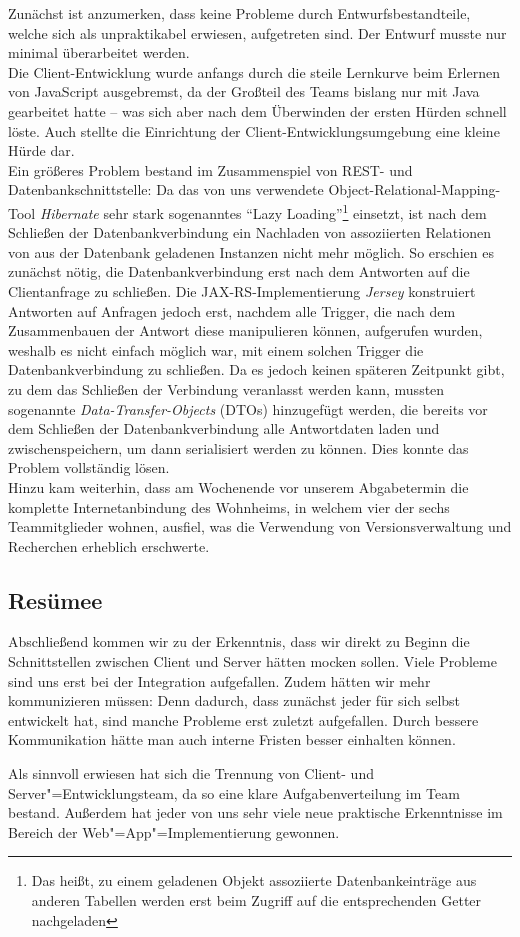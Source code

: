  Zunächst ist anzumerken, dass keine Probleme durch Entwurfsbestandteile, welche sich als unpraktikabel erwiesen, aufgetreten sind. Der Entwurf musste nur minimal überarbeitet werden. \\
 Die Client-Entwicklung wurde anfangs durch die steile Lernkurve beim Erlernen von JavaScript ausgebremst, da der Großteil des Teams bislang nur mit Java gearbeitet hatte -- was sich aber nach dem Überwinden der ersten Hürden schnell löste. Auch stellte die Einrichtung der Client-Entwicklungsumgebung eine kleine Hürde dar.\\
 Ein größeres Problem bestand im Zusammenspiel von REST- und Datenbankschnittstelle: Da das von uns verwendete Object-Relational-Mapping-Tool \textit{Hibernate} sehr stark sogenanntes \enquote{Lazy Loading}\footnote{Das heißt, zu einem geladenen Objekt assoziierte Datenbankeinträge aus anderen Tabellen werden erst beim Zugriff auf die entsprechenden Getter nachgeladen} einsetzt, ist nach dem Schließen der Datenbankverbindung ein Nachladen von assoziierten Relationen von aus der Datenbank geladenen Instanzen nicht mehr möglich. So erschien es zunächst nötig, die Datenbankverbindung erst nach dem Antworten auf die Clientanfrage zu schließen. Die JAX-RS-Implementierung \textit{Jersey} konstruiert Antworten auf Anfragen jedoch erst, nachdem alle Trigger, die nach dem Zusammenbauen der Antwort diese manipulieren können, aufgerufen wurden, weshalb es nicht einfach möglich war, mit einem solchen Trigger die Datenbankverbindung zu schließen. Da es jedoch keinen späteren Zeitpunkt gibt, zu dem das Schließen der Verbindung veranlasst werden kann, mussten sogenannte \textit{Data-Transfer-Objects} (DTOs) hinzugefügt werden, die bereits vor dem Schließen der Datenbankverbindung alle Antwortdaten laden und zwischenspeichern, um dann serialisiert werden zu können.
 Dies konnte das Problem vollständig lösen. \\
 Hinzu kam weiterhin, dass am Wochenende vor unserem Abgabetermin die komplette Internetanbindung des Wohnheims, in welchem vier der sechs Teammitglieder wohnen, ausfiel, was die Verwendung von Versionsverwaltung und Recherchen erheblich erschwerte. \\
 
 \subsection{Resümee}
 Abschließend kommen wir zu der Erkenntnis, dass wir direkt zu Beginn die Schnittstellen zwischen Client und Server hätten mocken sollen. Viele Probleme sind uns erst bei der Integration aufgefallen. Zudem hätten wir mehr kommunizieren müssen: Denn dadurch, dass zunächst jeder für sich selbst entwickelt hat, sind manche Probleme erst zuletzt aufgefallen. Durch bessere Kommunikation hätte man auch interne Fristen besser einhalten können.
 
 Als sinnvoll erwiesen hat sich die Trennung von Client- und Server"=Entwicklungsteam, da so eine klare Aufgabenverteilung im Team bestand. Außerdem hat jeder von uns sehr viele neue praktische Erkenntnisse im Bereich der Web"=App"=Implementierung gewonnen.
 
 